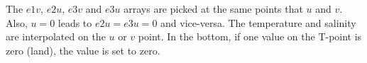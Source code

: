 \documentclass[a4paper,11pt]{article}
\begin{document}
\noindent
The $e1v$, $e2u$, $e3v$ and $e3u$ arrays are picked at the same points that $u$ and $v$. Also, $u = 0$ leads to $e2u = e3u = 0$ and vice-versa.
The temperature and salinity are interpolated on the $u$ or $v$ point. In the bottom, if one value on the T-point is zero (land), the value is set to
zero. 
\end{document}
